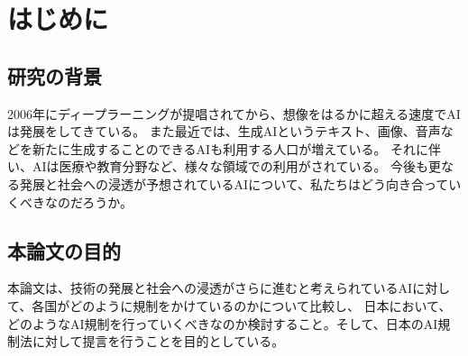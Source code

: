 \chapter{はじめに}

\section{研究の背景}
2006年にディープラーニングが提唱されてから、想像をはるかに超える速度でAIは発展をしてきている。
また最近では、生成AIというテキスト、画像、音声などを新たに生成することのできるAIも利用する人口が増えている。
それに伴い、AIは医療や教育分野など、様々な領域での利用がされている。
今後も更なる発展と社会への浸透が予想されているAIについて、私たちはどう向き合っていくべきなのだろうか。


\section{本論文の目的}
本論文は、技術の発展と社会への浸透がさらに進むと考えられているAIに対して、各国がどのように規制をかけているのかについて比較し、
日本において、どのようなAI規制を行っていくべきなのか検討すること。そして、日本のAI規制法に対して提言を行うことを目的としている。

